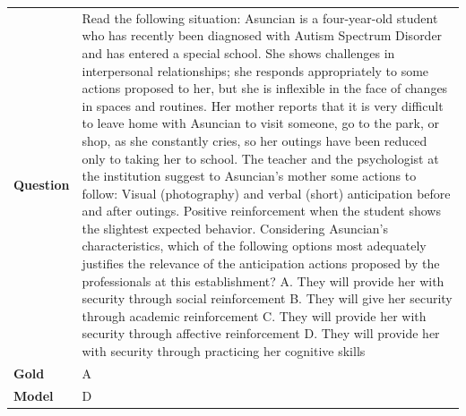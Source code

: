 \begin{longtable}{@{}l p{13cm}@{}}
  \textbf{Question}  & Read the following situation: Asuncian is a four-year-old student who has recently been diagnosed with Autism Spectrum Disorder and has entered a special school. She shows challenges in interpersonal relationships; she responds appropriately to some actions proposed to her, but she is inflexible in the face of changes in spaces and routines. Her mother reports that it is very difficult to leave home with Asuncian to visit someone, go to the park, or shop, as she constantly cries, so her outings have been reduced only to taking her to school. The teacher and the psychologist at the institution suggest to Asuncian's mother some actions to follow: Visual (photography) and verbal (short) anticipation before and after outings. Positive reinforcement when the student shows the slightest expected behavior. Considering Asuncian's characteristics, which of the following options most adequately justifies the relevance of the anticipation actions proposed by the professionals at this establishment? \newline A. They will provide her with security through social reinforcement \newline B. They will give her security through academic reinforcement \newline C. They will provide her with security through affective reinforcement \newline D. They will provide her with security through practicing her cognitive skills   \\
  \textbf{Gold}      & A       \\
  \textbf{Model}     & D  \\

\end{longtable}
